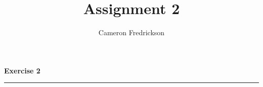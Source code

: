 \documentclass{article}
\title{Assignment 2}
\author{Cameron Fredrickson}
\date{}
\begin{document}
\maketitle

\noindent \textbf{Exercise 2}

\noindent \rule{\textwidth}{.1mm}
\end{document}
